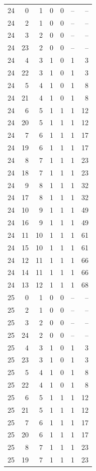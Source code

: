 \begin{longtable}{rrrrrrr}
24 & 0 & 1 & 0 & 0 & -- & --\\
24 & 2 & 1 & 0 & 0 & -- & --\\
24 & 3 & 2 & 0 & 0 & -- & --\\
24 & 23 & 2 & 0 & 0 & -- & --\\
24 & 4 & 3 & 1 & 0 & 1 & 3\\
24 & 22 & 3 & 1 & 0 & 1 & 3\\
24 & 5 & 4 & 1 & 0 & 1 & 8\\
24 & 21 & 4 & 1 & 0 & 1 & 8\\
24 & 6 & 5 & 1 & 1 & 1 & 12\\
24 & 20 & 5 & 1 & 1 & 1 & 12\\
24 & 7 & 6 & 1 & 1 & 1 & 17\\
24 & 19 & 6 & 1 & 1 & 1 & 17\\
24 & 8 & 7 & 1 & 1 & 1 & 23\\
24 & 18 & 7 & 1 & 1 & 1 & 23\\
24 & 9 & 8 & 1 & 1 & 1 & 32\\
24 & 17 & 8 & 1 & 1 & 1 & 32\\
24 & 10 & 9 & 1 & 1 & 1 & 49\\
24 & 16 & 9 & 1 & 1 & 1 & 49\\
24 & 11 & 10 & 1 & 1 & 1 & 61\\
24 & 15 & 10 & 1 & 1 & 1 & 61\\
24 & 12 & 11 & 1 & 1 & 1 & 66\\
24 & 14 & 11 & 1 & 1 & 1 & 66\\
24 & 13 & 12 & 1 & 1 & 1 & 68\\
25 & 0 & 1 & 0 & 0 & -- & --\\
25 & 2 & 1 & 0 & 0 & -- & --\\
25 & 3 & 2 & 0 & 0 & -- & --\\
25 & 24 & 2 & 0 & 0 & -- & --\\
25 & 4 & 3 & 1 & 0 & 1 & 3\\
25 & 23 & 3 & 1 & 0 & 1 & 3\\
25 & 5 & 4 & 1 & 0 & 1 & 8\\
25 & 22 & 4 & 1 & 0 & 1 & 8\\
25 & 6 & 5 & 1 & 1 & 1 & 12\\
25 & 21 & 5 & 1 & 1 & 1 & 12\\
25 & 7 & 6 & 1 & 1 & 1 & 17\\
25 & 20 & 6 & 1 & 1 & 1 & 17\\
25 & 8 & 7 & 1 & 1 & 1 & 23\\
25 & 19 & 7 & 1 & 1 & 1 & 23\\

\end{longtable}
